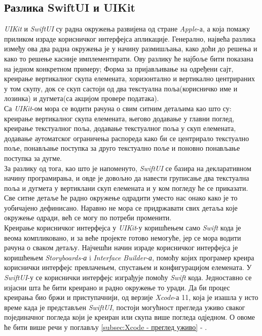 \documentclass[12pt,oneside]{memoir}
\begin{document}
\subsection{Разлика SwiftUI и UIKit}
\label{subsec:Разлика SwiftUI и UIKit}

\indent \textit{UIKit} и \textit{SwiftUI} су радна окружења развијена од стране \textit{Apple}-а, а која помажу приликом израде корисничког интерфејса апликације. Генерално, највећа разлика између ова два радна окружења је у начину размишљања, како доћи до решења и како то решење касније имплементирати. Ову разлику ће најбоље бити показана на једном конкретном примеру; Форма за пријављивање на одређени сајт, креирање вертикалног скупа елемената, хоризонтално и вертикално центрираних у том скупу, док се скуп састоји од два текстуална поља(корисничко име и лозинка) и дугмета(са акцијом провере података).
\\
\indent Са \textit{UIKit}-ом мора се водити рачуна о свим ситним детаљима као што су: креирање вертикалног скупа елемената, његово додавање у главни поглед, креирање текстуалног поља, додавање текстуалног поља у скуп елемената, додавање аутоматског ограничења распореда како би се центрирало текстуално поље, понављање поступка за друго текстуално поље и поновно понављање поступка за дугме. 
\\ %
\indent За разлику од тога, као што је напоменуто, \textit{SwiftUI} се базира на декларативном начину програмирања, и овде је довољно да навести груписање два текстуална поља и дугмета у вертиклани скуп елемената и у ком погледу ће се приказати. Све ситне детаље ће радно окружење одрадити уместо нас онако како је то уобичајено дефинисано. Наравно не мора се придржавати свих детаља које окружење одради, већ се могу по потреби променити.
\\
\indent Креирање корисничког интерфејса у \textit{UIKit}-у коришћењем само \textit{Swift} кода је веома компликовано, и за веће пројекте готово немогуће, јер се мора водити рачуна о сваком детаљу. Најчешћи начин израде корисничког интерфејса је коришћењем \textit{Storyboards-а} i \textit{Interface Builder-а}, помоћу којих програмер креира кориснички интерфејс превлачењем, спустањем и конфигурацијом елемената. У \textit{SwiftUI}-у се кориснички интерфејс изграђује помоћу \textit{Swift} кода. Једноставно се изјасни шта ће бити креирано и радно окружење то уради. Да би процес креирања био бржи и приступачнији, од верзије \textit{Xcode}-а 11, која је изашла у исто време када је представљен \textit{SwiftUI}, постоји могућност прегледа уживо сваког појединачног погледа који је креиран или скупа више погледа одједном. О овоме ће бити више речи у поглављу \ref{subsec:Xcode - преглед уживо} - .
\end{document}
